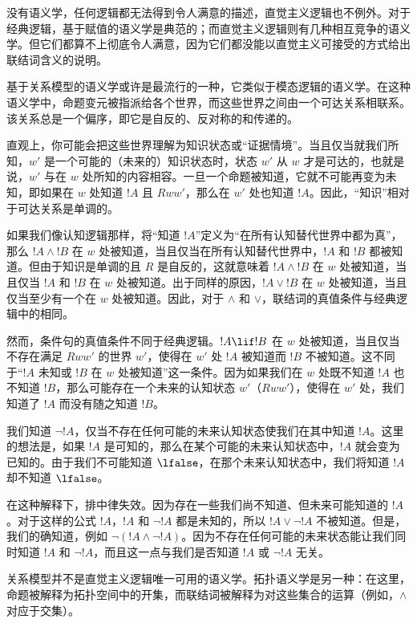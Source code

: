 \documentclass[../../../include/open-logic-section]{subfiles}
\begin{document}


没有语义学，任何逻辑都无法得到令人满意的描述，直觉主义逻辑也不例外。对于经典逻辑，基于赋值的语义学是典范的；而直觉主义逻辑则有几种相互竞争的语义学。但它们都算不上彻底令人满意，因为它们都没能以直觉主义可接受的方式给出联结词含义的说明。

基于关系模型的语义学或许是最流行的一种，它类似于模态逻辑的语义学。在这种语义学中，命题变元被指派给各个世界，而这些世界之间由一个可达关系相联系。该关系总是一个偏序，即它是自反的、反对称的和传递的。

直观上，你可能会把这些世界理解为知识状态或“证据情境”。当且仅当就我们所知，$w'$ 是一个可能的（未来的）知识状态时，状态 $w'$ 从 $w$ 才是可达的，也就是说，$w'$ 与在 $w$ 处所知的内容相容。一旦一个命题被知道，它就不可能再变为未知，即如果在 $w$ 处知道 $!A$ 且 $Rww'$，那么在 $w'$ 处也知道 $!A$。因此，“知识”相对于可达关系是单调的。

如果我们像认知逻辑那样，将“知道 $!A$”定义为“在所有认知替代世界中都为真”，那么 $!A \land !B$ 在 $w$ 处被知道，当且仅当在所有认知替代世界中，$!A$ 和 $!B$ 都被知道。但由于知识是单调的且 $R$ 是自反的，这就意味着 $!A \land !B$ 在 $w$ 处被知道，当且仅当 $!A$ 和 $!B$ 在 $w$ 处被知道。出于同样的原因，$!A \lor !B$ 在 $w$ 处被知道，当且仅当至少有一个在 $w$ 处被知道。因此，对于 $\land$ 和 $\lor$，联结词的真值条件与经典逻辑中的相同。

然而，条件句的真值条件不同于经典逻辑。$!A \lif !B$ 在 $w$ 处被知道，当且仅当不存在满足 $Rww'$ 的世界 $w'$，使得在 $w'$ 处 $!A$ 被知道而 $!B$ 不被知道。这不同于“$!A$ 未知或 $!B$ 在 $w$ 处被知道”这一条件。因为如果我们在 $w$ 处既不知道 $!A$ 也不知道 $!B$，那么可能存在一个未来的认知状态 $w'$（$Rww'$），使得在 $w'$ 处，我们知道了 $!A$ 而没有随之知道 $!B$。

我们知道 $\lnot !A$，仅当不存在任何可能的未来认知状态使我们在其中知道 $!A$。这里的想法是，如果 $!A$ 是可知的，那么在某个可能的未来认知状态中，$!A$ 就会变为已知的。由于我们不可能知道 $\lfalse$，在那个未来认知状态中，我们将知道 $!A$ 却不知道 $\lfalse$。

在这种解释下，排中律失效。因为存在一些我们尚不知道、但未来可能知道的 $!A$。对于这样的公式 $!A$，$!A$ 和 $\lnot !A$ 都是未知的，所以 $!A \lor \lnot !A$ 不被知道。但是，我们的确知道，例如 $\lnot(!A \land \lnot !A)$。因为不存在任何可能的未来状态能让我们同时知道 $!A$ 和 $\lnot !A$，而且这一点与我们是否知道 $!A$ 或 $\lnot !A$ 无关。

关系模型并不是直觉主义逻辑唯一可用的语义学。拓扑语义学是另一种：在这里，命题被解释为拓扑空间中的开集，而联结词被解释为对这些集合的运算（例如，$\land$ 对应于交集）。
\end{document}
